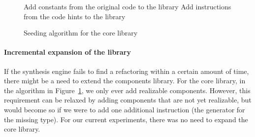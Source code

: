 \documentclass[sigconf,review,anonymous]{acmart}
\makeatletter
\newcommand{\removelatexerror}{\let\@latex@error\@gobble}
\makeatother
\begin{document}


\begin{figure}
\removelatexerror%
\begin{algorithm}[H]
\SetAlgoLined
{}
 Add constants from the original code to the library\;
 Add instructions from the code hints to the library\;
\end{algorithm}
 \caption{Seeding algorithm for the core library}
\label{alg:seeding-core}
\end{figure}


\paragraph{Incremental expansion of the library}
If the synthesis engine fails to find a refactoring within a certain amount of time,
there might be a need to extend the components library.
For the core library, in the algorithm in Figure~\ref{alg:seeding-core}, we only ever add realizable components. However, this requirement can be relaxed by adding components that
are not yet realizable, but would become so if we were to add one
additional instruction (the generator for the missing type). For our current experiments,
there was no need to expand the core library. 

\end{document}
